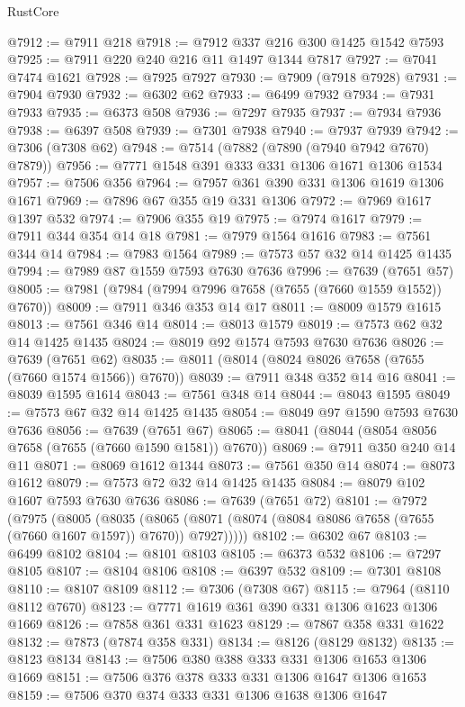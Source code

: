 \begin{lexlean}{RustCore}
\begin{coremodule}
@7912 := @7911 @218
@7918 := @7912 @337 @216 @300 @1425 @1542 @7593
@7925 := @7911 @220 @240 @216 @11 @1497 @1344 @7817
@7927 := @7041 @7474 @1621
@7928 := @7925 @7927
@7930 := @7909 (@7918 @7928)
@7931 := @7904 @7930
@7932 := @6302 @62
@7933 := @6499 @7932
@7934 := @7931 @7933
@7935 := @6373 @508
@7936 := @7297 @7935
@7937 := @7934 @7936
@7938 := @6397 @508
@7939 := @7301 @7938
@7940 := @7937 @7939
@7942 := @7306 (@7308 @62)
@7948 := @7514 (@7882 (@7890 (@7940 @7942 @7670) @7879))
@7956 := @7771 @1548 @391 @333 @331 @1306 @1671 @1306 @1534
@7957 := @7506 @356
@7964 := @7957 @361 @390 @331 @1306 @1619 @1306 @1671
@7969 := @7896 @67 @355 @19 @331 @1306
@7972 := @7969 @1617 @1397 @532
@7974 := @7906 @355 @19
@7975 := @7974 @1617
@7979 := @7911 @344 @354 @14 @18
@7981 := @7979 @1564 @1616
@7983 := @7561 @344 @14
@7984 := @7983 @1564
@7989 := @7573 @57 @32 @14 @1425 @1435
@7994 := @7989 @87 @1559 @7593 @7630 @7636
@7996 := @7639 (@7651 @57)
@8005 := @7981 (@7984 (@7994 @7996 @7658 (@7655 (@7660 @1559 @1552)) @7670))
@8009 := @7911 @346 @353 @14 @17
@8011 := @8009 @1579 @1615
@8013 := @7561 @346 @14
@8014 := @8013 @1579
@8019 := @7573 @62 @32 @14 @1425 @1435
@8024 := @8019 @92 @1574 @7593 @7630 @7636
@8026 := @7639 (@7651 @62)
@8035 := @8011 (@8014 (@8024 @8026 @7658 (@7655 (@7660 @1574 @1566)) @7670))
@8039 := @7911 @348 @352 @14 @16
@8041 := @8039 @1595 @1614
@8043 := @7561 @348 @14
@8044 := @8043 @1595
@8049 := @7573 @67 @32 @14 @1425 @1435
@8054 := @8049 @97 @1590 @7593 @7630 @7636
@8056 := @7639 (@7651 @67)
@8065 := @8041 (@8044 (@8054 @8056 @7658 (@7655 (@7660 @1590 @1581)) @7670))
@8069 := @7911 @350 @240 @14 @11
@8071 := @8069 @1612 @1344
@8073 := @7561 @350 @14
@8074 := @8073 @1612
@8079 := @7573 @72 @32 @14 @1425 @1435
@8084 := @8079 @102 @1607 @7593 @7630 @7636
@8086 := @7639 (@7651 @72)
@8101 := @7972
    (@7975
      (@8005
        (@8035
          (@8065 (@8071 (@8074 (@8084 @8086 @7658 (@7655 (@7660 @1607 @1597)) @7670)) @7927)))))
@8102 := @6302 @67
@8103 := @6499 @8102
@8104 := @8101 @8103
@8105 := @6373 @532
@8106 := @7297 @8105
@8107 := @8104 @8106
@8108 := @6397 @532
@8109 := @7301 @8108
@8110 := @8107 @8109
@8112 := @7306 (@7308 @67)
@8115 := @7964 (@8110 @8112 @7670)
@8123 := @7771 @1619 @361 @390 @331 @1306 @1623 @1306 @1669
@8126 := @7858 @361 @331 @1623
@8129 := @7867 @358 @331 @1622
@8132 := @7873 (@7874 @358 @331)
@8134 := @8126 (@8129 @8132)
@8135 := @8123 @8134
@8143 := @7506 @380 @388 @333 @331 @1306 @1653 @1306 @1669
@8151 := @7506 @376 @378 @333 @331 @1306 @1647 @1306 @1653
@8159 := @7506 @370 @374 @333 @331 @1306 @1638 @1306 @1647

\end{coremodule}
\end{lexlean}
